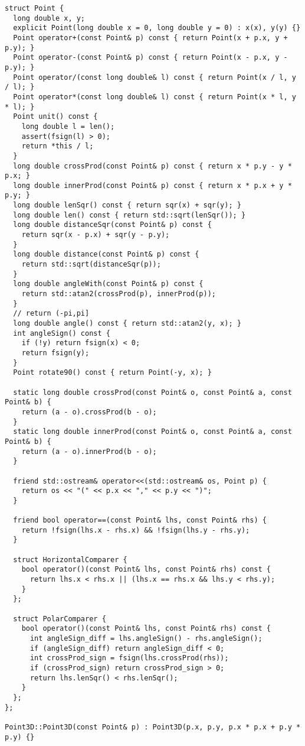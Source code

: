 \documentclass[6pt]{article}
\begin{document}
\begin{multicols}{2}
\begin{lstlisting}
struct Point {
  long double x, y;
  explicit Point(long double x = 0, long double y = 0) : x(x), y(y) {}
  Point operator+(const Point& p) const { return Point(x + p.x, y + p.y); }
  Point operator-(const Point& p) const { return Point(x - p.x, y - p.y); }
  Point operator/(const long double& l) const { return Point(x / l, y / l); }
  Point operator*(const long double& l) const { return Point(x * l, y * l); }
  Point unit() const {
    long double l = len();
    assert(fsign(l) > 0);
    return *this / l;
  }
  long double crossProd(const Point& p) const { return x * p.y - y * p.x; }
  long double innerProd(const Point& p) const { return x * p.x + y * p.y; }
  long double lenSqr() const { return sqr(x) + sqr(y); }
  long double len() const { return std::sqrt(lenSqr()); }
  long double distanceSqr(const Point& p) const {
    return sqr(x - p.x) + sqr(y - p.y);
  }
  long double distance(const Point& p) const {
    return std::sqrt(distanceSqr(p));
  }
  long double angleWith(const Point& p) const {
    return std::atan2(crossProd(p), innerProd(p));
  }
  // return (-pi,pi]
  long double angle() const { return std::atan2(y, x); }
  int angleSign() const {
    if (!y) return fsign(x) < 0;
    return fsign(y);
  }
  Point rotate90() const { return Point(-y, x); }

  static long double crossProd(const Point& o, const Point& a, const Point& b) {
    return (a - o).crossProd(b - o);
  }
  static long double innerProd(const Point& o, const Point& a, const Point& b) {
    return (a - o).innerProd(b - o);
  }

  friend std::ostream& operator<<(std::ostream& os, Point p) {
    return os << "(" << p.x << "," << p.y << ")";
  }

  friend bool operator==(const Point& lhs, const Point& rhs) {
    return !fsign(lhs.x - rhs.x) && !fsign(lhs.y - rhs.y);
  }

  struct HorizontalComparer {
    bool operator()(const Point& lhs, const Point& rhs) const {
      return lhs.x < rhs.x || (lhs.x == rhs.x && lhs.y < rhs.y);
    }
  };

  struct PolarComparer {
    bool operator()(const Point& lhs, const Point& rhs) const {
      int angleSign_diff = lhs.angleSign() - rhs.angleSign();
      if (angleSign_diff) return angleSign_diff < 0;
      int crossProd_sign = fsign(lhs.crossProd(rhs));
      if (crossProd_sign) return crossProd_sign > 0;
      return lhs.lenSqr() < rhs.lenSqr();
    }
  };
};

Point3D::Point3D(const Point& p) : Point3D(p.x, p.y, p.x * p.x + p.y * p.y) {}


\end{lstlisting}
\end{multicols}
\end{document}
